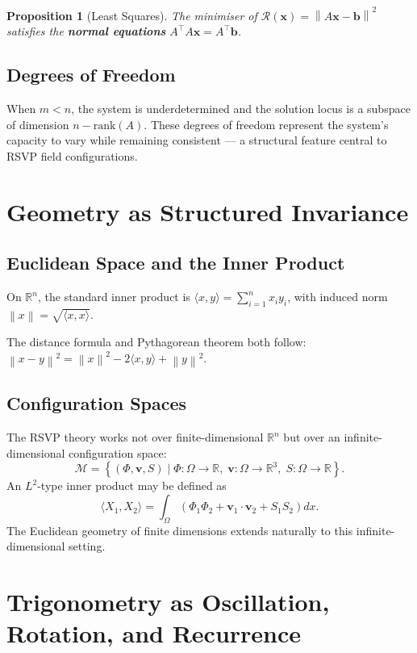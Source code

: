 \documentclass[11pt, openany]{book}
\theoremstyle{plain}
\newtheorem{proposition}[theorem]{Proposition}
\theoremstyle{definition}
\theoremstyle{remark}
\newcommand{\R}{\mathbb{R}}
\newcommand{\norm}[1]{\left\lVert#1\right\rVert}
\begin{document}
\begin{proposition}[Least Squares]
The minimiser of $\mathcal{R}(\mathbf{x})=\norm{A\mathbf{x}-\mathbf{b}}^2$
satisfies the \textbf{normal equations} $A^\top A\mathbf{x}=A^\top\mathbf{b}$.
\end{proposition}

\section{Degrees of Freedom}

When $m<n$, the system is underdetermined and the solution locus is a
subspace of dimension $n-\mathrm{rank}(A)$. These degrees of freedom
represent the system's capacity to vary while remaining consistent ---
a structural feature central to RSVP field configurations.

\chapter{Geometry as Structured Invariance}

\section{Euclidean Space and the Inner Product}

On $\R^n$, the standard inner product is
$\langle x,y\rangle=\sum_{i=1}^n x_iy_i$,
with induced norm $\norm{x}=\sqrt{\langle x,x\rangle}$.

The distance formula and Pythagorean theorem both follow:
$\norm{x-y}^2=\norm{x}^2-2\langle x,y\rangle+\norm{y}^2$.

\section{Configuration Spaces}

The RSVP theory works not over finite-dimensional $\R^n$ but over an
infinite-dimensional configuration space:
\[
  \mathcal{M}=\left\{(\Phi,\mathbf{v},S)\mid
  \Phi:\Omega\to\R,\;\mathbf{v}:\Omega\to\R^3,\;S:\Omega\to\R\right\}.
\]
An $L^2$-type inner product may be defined as
\[
  \langle X_1,X_2\rangle=
  \int_\Omega\!\left(\Phi_1\Phi_2+\mathbf{v}_1\cdot\mathbf{v}_2+S_1S_2\right)dx.
\]
The Euclidean geometry of finite dimensions extends naturally to this
infinite-dimensional setting.

\chapter{Trigonometry as Oscillation, Rotation, and Recurrence}
\end{document}
